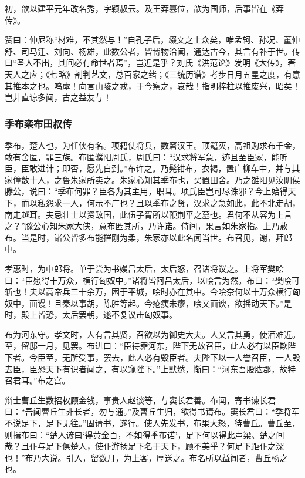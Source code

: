\documentclass[]{article}
\begin{document}
初，歆以建平元年改名秀，字颖叔云。及王莽篡位，歆为国师，后事皆在《莽传》。

赞曰：仲尼称``材难，不其然与！''自孔子后，缀文之士众矣，唯孟轲、孙况、董仲舒、司马迁、刘向、杨雄，此数公者，皆博物洽闻，通达古今，其言有补于世。传曰``圣人不出，其间必有命世者焉''，岂近是乎？刘氏《洪范论》发明《大传》，著天人之应；《七略》剖判艺文，总百家之绪；《三统历谱》考步日月五星之度，有意其推本之也。呜虖！向言山陵之戎，于今察之，哀哉！指明梓柱以推废兴，昭矣！岂非直谅多闻，古之益友与！

\hypertarget{header-n3671}{%
\subsubsection{季布栾布田叔传}\label{header-n3671}}

季布，楚人也，为任侠有名。项籍使将兵，数窘汉王。顶籍灭，高祖购求布千金，敢有舍匿，罪三族。布匿濮阳周氏，周氏曰：``汉求将军急，迹且至臣家，能听臣，臣敢进计；即否，愿先自刭。''布许之。乃髡钳布，衣褐，置广柳车中，并与其家僮数十人，之鲁朱家所卖之。朱家心知其季布也，买置田舍。乃之雒阳见汝阴侯滕公，说曰：``季布何罪？臣各为其主用，职耳。项氏臣岂可尽诛邪？今上始得天下，而以私怨求一人，何示不广也？且以季布之贤，汉求之急如此，此不北走胡，南走越耳。夫忌壮士以资敌国，此伍子胥所以鞭荆平之墓也。君何不从容为上言之？''滕公心知朱家大侠，意布匿其所，乃许诺。侍间，果言如朱家指。上乃赦布。当是时，诸公皆多布能摧刚为柔，朱家亦以此名闻当世。布召见，谢，拜郎中。

孝惠时，为中郎将。单于尝为书嫚吕太后，太后怒，召诸将议之。上将军樊哙曰：``臣愿得十万众，横行匈奴中。''诸将皆阿吕太后，以哙言为然。布曰：``樊哙可斩也！夫以高帝兵三十余万，困于平城，哙时亦在其中。今哙奈何以十万众横行匈奴中，面谩！且秦以事胡，陈胜等起。今疮痍未瘳，哙又面谀，欲摇动天下。''是时，殿上皆恐，太后罢朝，遂不复议击匈奴事。

布为河东守。孝文时，人有言其贤，召欲以为御史大夫。人又言其勇，使酒难近。至，留邸一月，见罢。布进曰：``臣待罪河东，陛下无故召臣，此人必有以臣欺陛下者。今臣至，无所受事，罢去，此人必有毁臣者。夫陛下以一人誉召臣，一人毁去臣，臣恐天下有识者闻之，有以窥陛下。''上默然，惭曰：``河东吾股肱郡，故特召君耳。''布之宫。

辩士曹丘生数招权顾金钱，事贵人赵谈等，与窦长君善。布闻，寄书谏长君曰：``吾闻曹丘生非长者，勿与通。''及曹丘生归，欲得书请布。窦长君曰：``季将军不说足下，足下无往。''固请书，遂行。使人先发书，布果大怒，待曹丘。曹丘至，则揖布曰：``楚人谚曰`得黄金百，不如得季布诺'，足下何以得此声梁、楚之间哉？且仆与足下俱楚人，使仆游扬足下名于天下，顾不美乎？何足下距仆之深也！''布乃大说。引入，留数月，为上客，厚送之。布名所以益闻者，曹丘杨之也。
\end{document}
